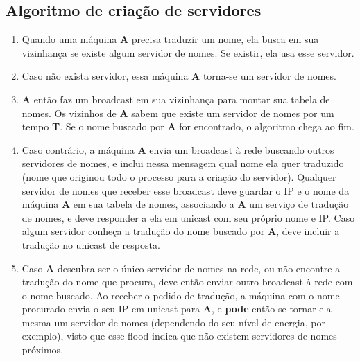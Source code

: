     \subsection{Algoritmo de criação de servidores}
        \begin{enumerate}
            \item Quando uma máquina \textbf{A} precisa traduzir um nome, ela
            busca em sua vizinhança se existe algum servidor de nomes. Se existir,
            ela usa esse servidor.
            \item Caso não exista servidor, essa máquina \textbf{A} torna-se um 
            servidor de nomes.
            \item \textbf{A} então faz um broadcast em sua vizinhança para montar
            sua tabela de nomes. Os vizinhos de \textbf{A} sabem que existe um
            servidor de nomes por um tempo \textbf{T}. Se o nome buscado por
            \textbf{A} for encontrado, o algoritmo chega ao fim.
            \item Caso contrário, a máquina \textbf{A} envia um broadcast à rede
            buscando outros servidores de nomes, e inclui nessa mensagem qual nome
            ela quer traduzido (nome que originou todo o processo para a criação
            do servidor). Qualquer servidor de nomes que receber esse broadcast
            deve guardar o IP e o nome da máquina \textbf{A} em sua tabela de nomes,
            associando a \textbf{A} um serviço de tradução de nomes, e deve
            responder a ela em unicast com seu próprio nome e IP. Caso algum
            servidor conheça a tradução do nome buscado por \textbf{A}, deve
            incluir a tradução no unicast de resposta.
            \item Caso \textbf{A} descubra ser o único servidor de nomes na rede,
            ou não encontre a tradução do nome que procura, deve então enviar
            outro broadcast à rede com o nome buscado. Ao receber o pedido de
            tradução, a máquina com o nome procurado envia o seu IP em unicast
            para \textbf{A}, e \textbf{pode} então se tornar ela mesma um servidor
            de nomes (dependendo do seu nível de energia, por exemplo), visto que
            esse flood indica que não existem servidores de nomes próximos.
        \end{enumerate}
    
